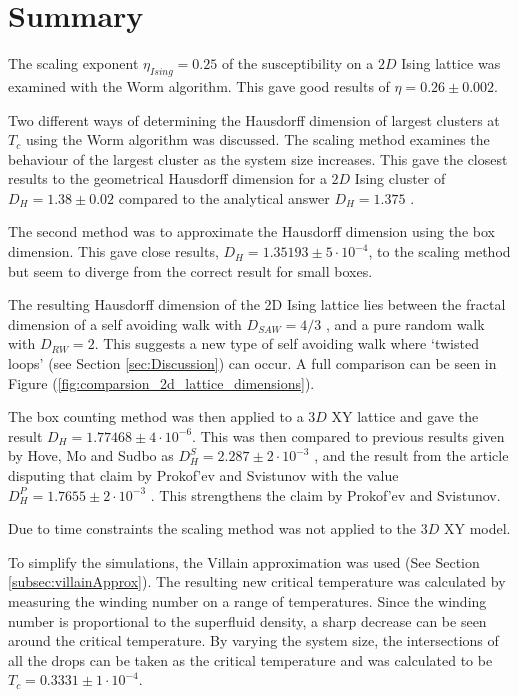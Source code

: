 \section{Summary}
\label{sec:Summary}

The scaling exponent $\eta_{Ising} = 0.25$ of the susceptibility on a $2D$ Ising lattice was examined with the Worm algorithm. This gave good results of $\eta = 0.26 \pm 0.002$.

Two different ways of determining the Hausdorff dimension of largest clusters at $T_c$ using the Worm algorithm was discussed. The scaling method examines the behaviour of the largest cluster as the system size increases. This gave the closest results to the geometrical Hausdorff dimension for a $2D$ Ising cluster of $D_H = 1.38 \pm 0.02$ compared to the analytical answer $D_H = 1.375$ \cite{Duplantier:GeoHausdorff}.

The second method was to approximate the Hausdorff dimension using the box dimension. This gave close results, $D_H = 1.35193 \pm 5 \cdot 10^{-4}$, to the scaling method but seem to diverge from the correct result for small boxes.

The resulting Hausdorff dimension of the 2D Ising lattice lies between the fractal dimension of a self avoiding walk with $D_{SAW} = 4/3$ \cite{Vilgis:FlorySAW}, and a pure random walk with $D_{RW} = 2$. This suggests a new type of self avoiding walk where `twisted loops' (see Section \ref{sec:Discussion}) can occur. A full comparison can be seen in Figure (\ref{fig:comparsion_2d_lattice_dimensions}).

The box counting method was then applied to a $3D$ XY lattice and gave the result $D_H = 1.77468 \pm 4 \cdot 10^{-6}$. This was then compared to previous results given by Hove, Mo and Sudbo as $D_H^S = 2.287 \pm 2 \cdot 10^{-3}$ \cite{Hove:hausdorff_crit_fluctuations}, and the result from the article disputing that claim by Prokof'ev and Svistunov with the value $D_H^P = 1.7655 \pm 2 \cdot 10^{-3}$ \cite{Prokofev:comment_on_hove_hausdorff_crit_fluct}. This strengthens the claim by Prokof'ev and Svistunov.

Due to time constraints the scaling method was not applied to the $3D$ XY model.

To simplify the simulations, the Villain approximation was used (See Section \ref{subsec:villainApprox}). The resulting new critical temperature was calculated by measuring the winding number on a range of temperatures. Since the winding number is proportional to the superfluid density, a sharp decrease can be seen around the critical temperature. By varying the system size, the intersections of all the drops can be taken as the critical temperature and was calculated to be $T_c = 0.3331 \pm 1 \cdot 10^{-4}$.

